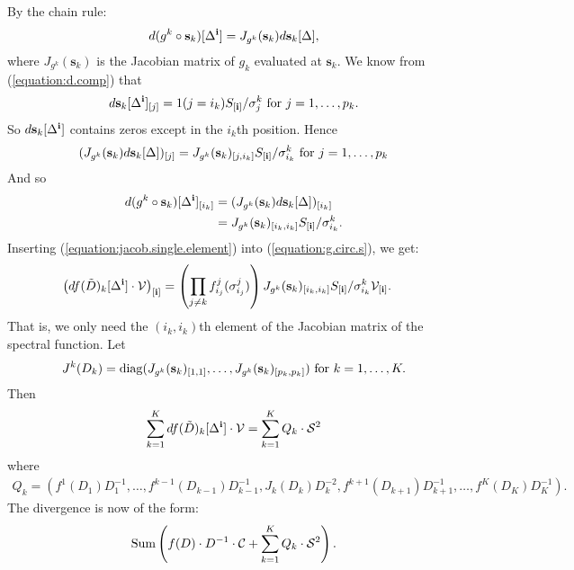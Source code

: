 By the chain rule:
\begin{align*}
  d(g^k \circ \mathbf{s}_k)[\Delta^{\bf i}] = J_{g^k}(\mathbf{s}_k) d\mathbf{s}_k[\Delta],
\end{align*}
where $J_{g^k}(\mathbf{s}_k)$ is the Jacobian matrix of $g_k$
evaluated at $\mathbf{s}_k$. We know from (\ref{equation:d.comp}) that
\begin{align*}
  d\mathbf{s}_{k}[\Delta^{\bf i}]_{[j]} = 1(j = i_k)S_{[{\bf i}]}
  / \sigma_j^k \text{ for } j = 1,\ldots,p_k.
\end{align*}
So $d\mathbf{s}_k[\Delta^{\bf i}]$ contains zeros except in the $i_k$th position. Hence
\begin{align*}
  (J_{g^k}(\mathbf{s}_k) d\mathbf{s}_k[\Delta])_{[j]} = J_{g^k}(\mathbf{s}_k)_{[j,i_k]}S_{[{\bf i}]}
  / \sigma_{i_k}^k \text{ for } j = 1,\ldots,p_k
\end{align*}
And so
\begin{align}
  d(g^k \circ \mathbf{s}_k)[\Delta^{\bf i}]_{[i_k]} &=
  (J_{g^k}(\mathbf{s}_k) d\mathbf{s}_k[\Delta])_{[i_k]}\nonumber\\
  &= J_{g^k}(\mathbf{s}_k)_{[i_k,i_k]}S_{[{\bf i}]}/\sigma_{i_k}^k. \label{equation:jacob.single.element}
\end{align}
Inserting (\ref{equation:jacob.single.element}) into
(\ref{equation:g.circ.s}), we get:
\begin{align*}
  \left(df(\tilde{D})_k[\Delta^{\bf i}] \cdot
    \mathcal{V}\right)_{[\mathbf{i}]} &= \left(\prod_{j\neq
      k}f_{i_j}^j(\sigma_{i_j}^j)\right)
  J_{g^k}(\mathbf{s}_k)_{[i_k,i_k]}S_{[{\bf
      i}]}/\sigma_{i_k}^k\mathcal{V}_{[{\bf i}]}.
\end{align*}
That is, we only need the $(i_k,i_k)$th element of the Jacobian matrix
of the spectral function. Let
\begin{align*}
  J^k(D_k) =
  \operatorname*{diag}(J_{g^k}(\mathbf{s}_k)_{[1,1]},\ldots,J_{g^k}(\mathbf{s}_k)_{[p_k,p_k]})
  \text{ for } k=1,\ldots,K.
\end{align*}
Then
\begin{align*}
  \sum_{k=1}^K df(\tilde{D})_k[\Delta^{\bf i}] \cdot \mathcal{V} = \sum_{k=1}^K Q_k \cdot \mathcal{S}^2
\end{align*}
where
\begin{align*}
  Q_k = (f^1(D_1)D_1^{-1},\ldots,f^{k-1}(D_{k-1})D_{k-1}^{-1},J_k(D_k)D_{k}^{-2},f^{k+1}(D_{k+1})D_{k+1}^{-1},\ldots,f^K(D_K)D_{K}^{-1}).
\end{align*}
The divergence is now of the form:
\begin{align*}
  \operatorname*{Sum}\left(f(D) \cdot D^{-1}\cdot \mathcal{C} + \sum_{k=1}^KQ_k \cdot \mathcal{S}^2\right).
\end{align*}

